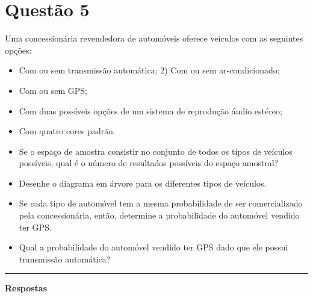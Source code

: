 \documentclass{article}
\begin{document}
\section*{\sffamily Questão 5}
Uma concessionária revendedora de automóveis oferece veículos com as seguintes opções: 

\begin{itemize}
\item [1)] Com ou sem transmissão automática; 2) Com ou sem ar-condicionado; 
\item [2)] Com ou sem GPS; 
\item [3)] Com duas possíveis opções de um sistema de reprodução áudio estéreo; 
\item [4)] Com quatro cores padrão.
\end{itemize}

\begin{itemize}
\item [a)]
Se o espaço de amostra consistir no conjunto de todos os tipos de veículos possíveis, qual é o número
de resultados possíveis do espaço amostral?

\item [b)]
Desenhe o diagrama em árvore para os diferentes tipos de veículos.

\item [c)]
Se cada tipo de automóvel tem a mesma probabilidade de ser comercializado pela concessionária,
então, determine a probabilidade do automóvel vendido ter GPS.

\item [d)]
Qual a probabilidade do automóvel vendido ter GPS dado que ele possui transmissão automática?
\end{itemize}
\rule{\linewidth}{0.5pt}

\textbf{\sffamily Respostas}
\end{document}
